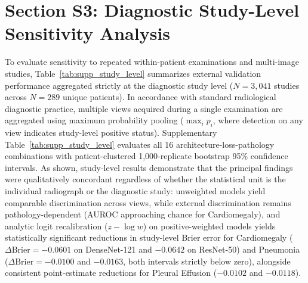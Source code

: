 \documentclass[preprint,12pt]{elsarticle}
\begin{document}
\section*{Section S3: Diagnostic Study-Level Sensitivity Analysis}
To evaluate sensitivity to repeated within-patient examinations and multi-image studies, Table~\ref{tab:supp_study_level} summarizes external validation performance aggregated strictly at the diagnostic study level ($N = 3,041$ studies across $N = 289$ unique patients). In accordance with standard radiological diagnostic practice, multiple views acquired during a single examination are aggregated using maximum probability pooling ($\max_i p_i$, where detection on any view indicates study-level positive status). Supplementary Table~\ref{tab:supp_study_level} evaluates all 16 architecture-loss-pathology combinations with patient-clustered 1,000-replicate bootstrap 95\% confidence intervals. As shown, study-level results demonstrate that the principal findings were qualitatively concordant regardless of whether the statistical unit is the individual radiograph or the diagnostic study: unweighted models yield comparable discrimination across views, while external discrimination remains pathology-dependent (AUROC approaching chance for Cardiomegaly), and analytic logit recalibration ($z - \log w$) on positive-weighted models yields statistically significant reductions in study-level Brier error for Cardiomegaly ($\Delta\text{Brier} = -0.0601$ on DenseNet-121 and $-0.0642$ on ResNet-50) and Pneumonia ($\Delta\text{Brier} = -0.0100$ and $-0.0163$, both intervals strictly below zero), alongside consistent point-estimate reductions for Pleural Effusion ($-0.0102$ and $-0.0118$).
\end{document}
